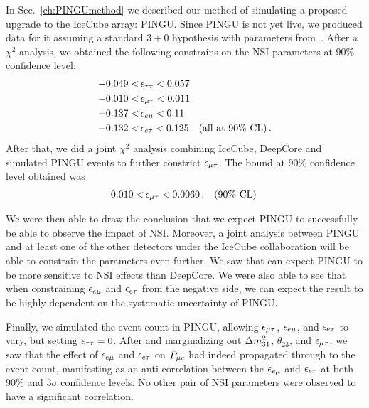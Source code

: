 In Sec.~\ref{ch:PINGUmethod} we described our method of simulating a proposed upgrade to the IceCube array: PINGU.
Since PINGU is not yet live, we produced data for it assuming a standard $3+0$ hypothesis with parameters from~\cite{nufit}.
After a $\chi^2$ analysis, we obtained the following constrains on the NSI parameters at 90\% confidence level:
\begin{align}
    -0.049 <&\, \epsilon_{\tau\tau} < 0.057 \nonumber \\
    -0.010 <&\, \epsilon_{\mu\tau} < 0.011 \nonumber \\
    -0.137 <&\, \epsilon_{e\mu} < 0.11 \nonumber \\
    -0.132 <&\, \epsilon_{e\tau} < 0.125 \quad (\text{all at }90\% \text{ CL})\,.
 \end{align}
After that, we did a joint $\chi^2$ analysis combining IceCube, DeepCore and simulated PINGU events to further constrict $\epsilon_{\mu\tau}$. The bound at 90\% confidence level obtained was
\begin{align}
    -0.010 <&\, \epsilon_{\mu\tau} < 0.0060\,. \quad (90\% \text{ CL})
 \end{align}

We were then able to draw the conclusion that we expect PINGU to successfully be able to observe the impact of NSI. Moreover, a joint analysis between PINGU and at least one of the other detectors under the IceCube collaboration
will be able to constrain the parameters even further. We saw that can expect PINGU to be more sensitive to NSI effects than DeepCore. We were also able to see that when constraining $\epsilon_{e\mu}$ and $\epsilon_{e\tau}$ from the negative side, 
we can expect the result to be highly dependent on the systematic uncertainty of PINGU.

Finally, we simulated the event count in PINGU, allowing $\epsilon_{\mu\tau}$, $\epsilon_{e\mu}$, and $\epsilon_{e\tau}$ to vary, but setting $\epsilon_{\tau\tau}=0$.
After and marginalizing out $\dm[31]$, $\theta_{23}$, and $\epsilon_{\mu\tau}$, we saw that the effect of $\epsilon_{e\mu}$ and $\epsilon_{e\tau}$ on $P_{\mu e}$ had indeed propagated through to the event count,
manifesting as an anti-correlation between the $\epsilon_{e\mu}$ and $\epsilon_{e\tau}$ at both 90\% and $3\sigma$ confidence levels. No other pair of NSI parameters were observed to have 
a significant correlation.